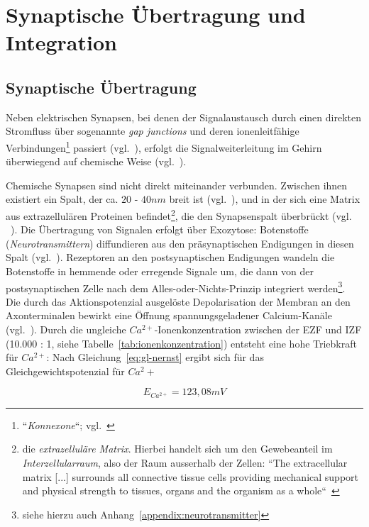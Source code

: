 {\section{Synaptische Übertragung und Integration}\label{appendix:synaptische-integration}
\subsection*{Synaptische Übertragung}\label{sec:synaptischeuebertragung}
Neben elektrischen Synapsen, bei denen der Signalaustausch durch einen direkten Stromfluss über sogenannte \textit{gap junctions} und deren ionenleitfähige Verbindungen\footnote{
    ``\textit{Konnexone}``; vgl.~\cite[50]{SD07}
} passiert (vgl.~\cite[119]{BCP18}), erfolgt die Signalweiterleitung im Gehirn überwiegend auf chemische Weise (vgl.~\cite[121 ff.]{BCP18}).

Chemische Synapsen sind nicht direkt miteinander verbunden.
Zwischen ihnen existiert ein Spalt, der ca. $20$ - $40 nm$ breit ist (vgl.~\cite[184]{KSJ+13}), und in der sich eine Matrix aus extrazellulären Proteinen befindet\footnote{
    die \textit{extrazelluläre Matrix}. Hierbei handelt sich um den Gewebeanteil im \textit{Interzellularraum}, also der Raum ausserhalb der Zellen: ``The extracellular matrix {[...]} surrounds all connective tissue cells providing mechanical support and physical strength to tissues, organs and the organism as a whole``~\cite[3]{AHH+98}
}, die den Synapsenspalt überbrückt (vgl. ~\cite[122]{BCP18}).
Die Übertragung von Signalen erfolgt über Exozytose: Botenstoffe (\textit{Neurotransmittern}) diffundieren aus den präsynaptischen Endigungen in diesen Spalt (vgl.~\cite[122]{BCP18}). Rezeptoren an den postsynaptischen Endigungen wandeln die Botenstoffe in hemmende oder erregende Signale um, die dann von der postsynaptischen Zelle nach dem Alles-oder-Nichts-Prinzip integriert werden\footnote{siehe hierzu auch Anhang~\ref{appendix:neurotransmitter}}.\\

Die durch das Aktionspotenzial ausgelöste Depolarisation der Membran an den Axonterminalen bewirkt eine Öffnung spannungsgeladener Calcium-Kanäle (vgl.~\cite[184]{KSJ+13}).
Durch die ungleiche $Ca^{2+}$-Ionenkonzentration zwischen der EZF und IZF (10.000 : 1, siehe Tabelle~\ref{tab:ionenkonzentration}) entsteht eine hohe Triebkraft für $Ca^{2+}$: Nach Gleichung~\ref{eq:gl-nernst} ergibt sich für das Gleichgewichtspotenzial für $Ca^2+$

\begin{equation}
    E_{Ca^{2+}} = 123,08 mV
    \label{eq:gl-eqca2}
\end{equation}


}

